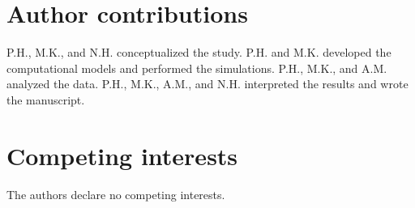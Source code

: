 \documentclass[11pt]{article}
\begin{document}
\section*{Author contributions}
P.H., M.K., and N.H. conceptualized the study.
P.H. and M.K. developed the computational models and performed the simulations.
P.H., M.K., and A.M. analyzed the data.
P.H., M.K., A.M., and N.H. interpreted the results and wrote the manuscript.

\section*{Competing interests}
The authors declare no competing interests.



\end{document}
